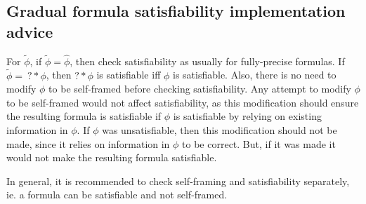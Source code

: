 \documentclass {article}
\newcommand{\fphi}{\widehat{\phi}}
\newcommand{\tphi}{\widetilde{\phi}}
\begin{document}
\subsection{Gradual formula satisfiability implementation advice}
For $\tphi$, if $\tphi = \fphi$, then check satisfiability as usually for fully-precise formulas. If $\tphi = \ ? \ast \phi$, then $? \ast \phi$ is satisfiable iff $\phi$ is satisfiable. Also, there is no need to modify $\phi$ to be self-framed before checking satisfiability. Any attempt to modify $\phi$ to be self-framed would not affect satisfiability, as this modification should ensure the resulting formula is satisfiable if $\phi$ is satisfiable by relying on existing information in $\phi$. If $\phi$ was unsatisfiable, then this modification should not be made, since it relies on information in $\phi$ to be correct. But, if it was made it would not make the resulting formula satisfiable.


In general, it is recommended to check self-framing and satisfiability separately, ie. a formula can be satisfiable and not self-framed.
\end{document}

